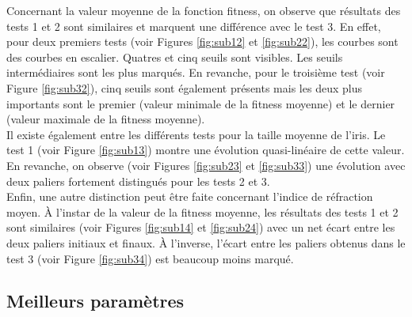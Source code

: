 \documentclass[a4paper,11pt]{article}
\begin{document}
Concernant la valeur moyenne de la fonction fitness, on observe que résultats des tests 1 et 2 sont similaires et marquent une différence avec le test 3. En effet, pour deux premiers tests (voir Figures \ref{fig:sub12} et \ref{fig:sub22}), les courbes sont des courbes en escalier. Quatres et cinq seuils sont visibles. Les seuils intermédiaires sont les plus marqués. En revanche, pour le troisième test (voir Figure \ref{fig:sub32}), cinq seuils sont également présents mais les deux plus importants sont le premier (valeur minimale de la fitness moyenne) et le dernier (valeur maximale de la fitness moyenne).\\

Il existe également entre les différents tests pour la taille moyenne de l'iris. Le test 1 (voir Figure \ref{fig:sub13}) montre une évolution quasi-linéaire de cette valeur. En revanche, on observe (voir Figures \ref{fig:sub23} et \ref{fig:sub33}) une évolution avec deux paliers fortement distingués pour les tests 2 et 3.\\

Enfin, une autre distinction peut être faite concernant l'indice de réfraction moyen. À l'instar de la valeur de la fitness moyenne, les résultats des tests 1 et 2 sont similaires (voir Figures \ref{fig:sub14} et \ref{fig:sub24}) avec un net écart entre les deux paliers initiaux et finaux. À l'inverse, l'écart entre les paliers obtenus dans le test 3 (voir Figure \ref{fig:sub34}) est beaucoup moins marqué.

\subsection{Meilleurs paramètres}
\end{document}
